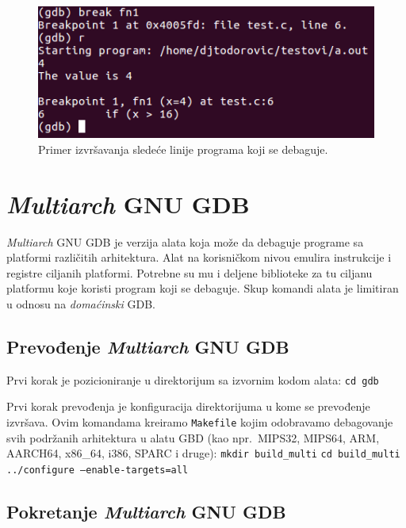 \documentclass[12pt,oneside]{memoir}
\begin{document}
\begin{figure}[h!]
	\begin{center}
		\includegraphics[scale=0.5]{slike/break-fn.png}
	\end{center}
	\caption{Primer izvršavanja sledeće linije programa koji se debaguje.}
	\label{fig:next}
\end{figure}

\newpage
\section{\emph{Multiarch} GNU GDB}

\emph{Multiarch} GNU GDB je verzija alata koja može da debaguje programe sa platformi različitih arhitektura. Alat na korisničkom nivou emulira instrukcije i registre ciljanih platformi. Potrebne su mu i deljene biblioteke za tu ciljanu platformu koje koristi program koji se debaguje. Skup komandi alata je limitiran u odnosu na \emph{domaćinski} GDB.

\subsection{Prevođenje \emph{Multiarch} GNU GDB}

Prvi korak je pozicioniranje u direktorijum sa izvornim kodom alata:
\newline
\texttt{cd gdb}

Prvi korak prevođenja je konfiguracija direktorijuma u kome se prevođenje izvršava. Ovim komandama kreiramo \texttt{Makefile} kojim odobravamo debagovanje svih podržanih arhitektura u alatu GBD (kao npr.~MIPS32, MIPS64, ARM, AARCH64, x86\_64, i386, SPARC i druge):
\newline
\texttt{mkdir build\_multi}
\newline
\texttt{cd build\_multi}
\newline
\texttt{../configure --enable-targets=all}

\subsection{Pokretanje \emph{Multiarch} GNU GDB}
\end{document}
